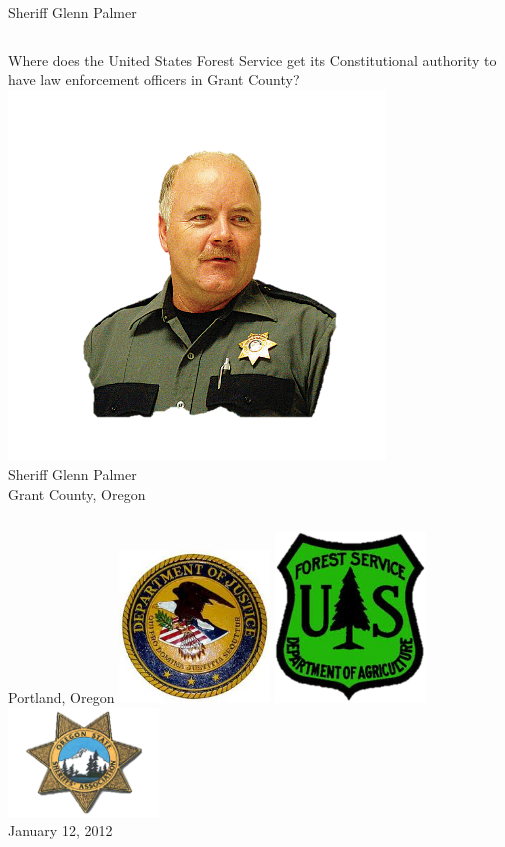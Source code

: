 \begin{frame}{Sheriff Glenn Palmer}
    \begin{columns}[onlytextwidth]
            \centering
            Where does the United States Forest Service get its Constitutional authority to have law enforcement officers in Grant County?
            \centering
            \includegraphics[width=0.75\textwidth]{img/glenn-palmer.png}
            \\ Sheriff Glenn Palmer
            \\ Grant County, Oregon
    \end{columns}
\end{frame}

\begin{frame}{Portland, Oregon}
    \includegraphics[width=0.3\textwidth]{img/doj.png}
    \includegraphics[width=0.3\textwidth]{img/usfs.png}
    \includegraphics[width=0.3\textwidth]{img/ossa.png}
    {   
        \centering
        \\ January 12, 2012 \\
    }
\end{frame}

